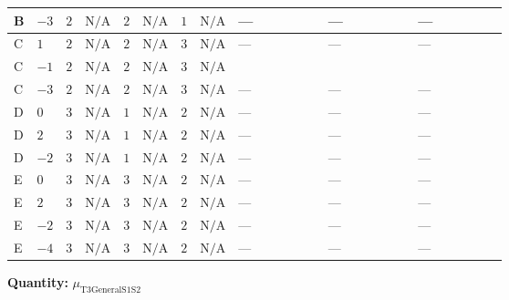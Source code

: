\documentclass[8pt]{article}
\begin{document}
\begin{landscape}
\begin{longtable}{@{}llcccccc >{\raggedright\arraybackslash}p{0.21\linewidth} >{\raggedright\arraybackslash}p{0.21\linewidth} >{\raggedright\arraybackslash}p{0.21\linewidth}@{}}
\midrule
B & $-3$ & $2$ & $\text{N/A}$ & $2$ & $\text{N/A}$ & $1$ & $\text{N/A}$ & --- & --- & --- \\
\midrule
C & $1$ & $2$ & $\text{N/A}$ & $2$ & $\text{N/A}$ & $3$ & $\text{N/A}$ & --- & --- & --- \\
\midrule
C & $-1$ & $2$ & $\text{N/A}$ & $2$ & $\text{N/A}$ & $3$ & $\text{N/A}$ & \scriptsize\adjustbox{max width=\linewidth}{$\begin{gathered} +2 {\lambda_{12}^{(1)}} {\mu_{\mathrm{T3GeneralS1S2}}}\end{gathered}$} & \scriptsize\adjustbox{max width=\linewidth}{$\begin{gathered} -\frac{3 {\lambda_{12}^{(A)}} {\mu_{\mathrm{T3GeneralS1S2}}}}{2}\end{gathered}$} & \scriptsize\adjustbox{max width=\linewidth}{$\begin{gathered} +6 {\lambda_{10}} {m_2^2}\end{gathered}$} \\
\midrule
C & $-3$ & $2$ & $\text{N/A}$ & $2$ & $\text{N/A}$ & $3$ & $\text{N/A}$ & --- & --- & --- \\
\midrule
D & $0$ & $3$ & $\text{N/A}$ & $1$ & $\text{N/A}$ & $2$ & $\text{N/A}$ & --- & --- & --- \\
\midrule
D & $2$ & $3$ & $\text{N/A}$ & $1$ & $\text{N/A}$ & $2$ & $\text{N/A}$ & --- & --- & --- \\
\midrule
D & $-2$ & $3$ & $\text{N/A}$ & $1$ & $\text{N/A}$ & $2$ & $\text{N/A}$ & --- & --- & --- \\
\midrule
E & $0$ & $3$ & $\text{N/A}$ & $3$ & $\text{N/A}$ & $2$ & $\text{N/A}$ & --- & --- & --- \\
\midrule
E & $2$ & $3$ & $\text{N/A}$ & $3$ & $\text{N/A}$ & $2$ & $\text{N/A}$ & --- & --- & --- \\
\midrule
E & $-2$ & $3$ & $\text{N/A}$ & $3$ & $\text{N/A}$ & $2$ & $\text{N/A}$ & --- & --- & --- \\
\midrule
E & $-4$ & $3$ & $\text{N/A}$ & $3$ & $\text{N/A}$ & $2$ & $\text{N/A}$ & --- & --- & --- \\
\midrule
\bottomrule
\end{longtable}
\clearpage
\noindent\textbf{Quantity: }${\mu_{\mathrm{T3GeneralS1S2}}}$\par\smallskip

\end{landscape}
\end{document}
